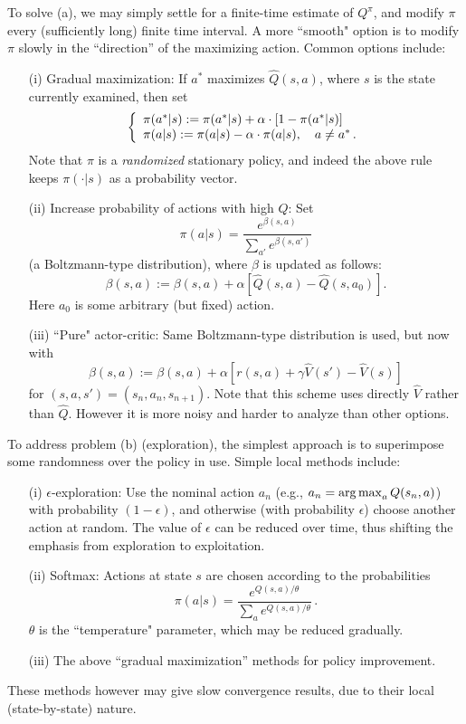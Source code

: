 To solve (a), we may simply settle for a finite-time estimate of $Q^{\pi}$, and
modify $\pi$ every (sufficiently long) finite time interval.
A more ``smooth" option is to modify $\pi$ slowly in the ``direction'' of the
maximizing action. Common options include:
\begin{itemize}
\item[(i)]
Gradual maximization:
If $a^*$ maximizes $\hat Q(s,a)$, where $s$ is the state currently examined,
then set
$$
\left\{
\begin{array}{l}
\pi(a^*|s) := \pi(a^*|s) + \alpha \cdot [1-\pi(a^*|s)]\\
\pi(a|s) := \pi(a|s) - \alpha \cdot \pi(a|s), \quad a\not= a^*\,.
\end{array}
\right.
$$
Note that $\pi$ is a {\em randomized} stationary policy,
and indeed the above rule keeps $\pi(\cdot |s)$ as a probability vector.
\item[(ii)]
Increase probability of actions with high $Q$: Set
$$
\pi(a|s)=\frac{e^{\beta(s,a)}}{\sum_{a'} e^{\beta(s,a')}}
$$
(a Boltzmann-type distribution), where $\beta$ is updated as follows:
$$
\beta(s,a):=\beta(s,a) +\alpha[\hat Q(s,a)- \hat Q(s,a_0)].
$$
Here $a_0$ is some arbitrary (but fixed) action.
\item[(iii)]
``Pure" actor-critic: Same Boltzmann-type distribution is used, but now with
$$
\beta(s,a):=\beta(s,a) +\alpha[r(s,a)+\gamma\hat V(s') -\hat V(s)]
$$
for $(s,a,s')=(s_n,a_n,s_{n+1})$. Note that this scheme uses directly
$\hat V$ rather than $\hat Q$. However it is more noisy and harder to
analyze than other options.
\end{itemize}

To address problem (b) (exploration), the simplest approach is to superimpose
some randomness over the policy in use.
Simple local methods include:
\begin{itemize}
\item[(i)]
$\epsilon$-exploration: Use the nominal action $a_n$ (e.g., $a_n=\argmax_a Q(s_n,a)$)
with probability $(1-\epsilon)$, and otherwise (with probability $\epsilon$) choose
another action at random. The value of $\epsilon$ can be reduced over time,
thus shifting the emphasis from exploration to exploitation.
\item[(ii)]
Softmax: Actions at state $s$ are chosen according to the probabilities
$$
\pi(a|s) = \frac{e^{Q(s,a)/\theta}}{\sum_a e^{Q(s,a)/\theta}}\,.
$$
$\theta$ is the ``temperature" parameter, which may be reduced gradually.
\item[(iii)]
The above ``gradual maximization'' methods for policy improvement.
\end{itemize}
These methods however may give slow convergence results, due to their local
(state-by-state) nature.

